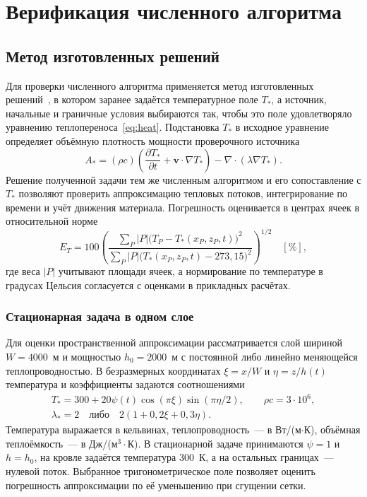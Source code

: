 \section{Верификация численного алгоритма}
\label{sec:verification}

\subsection{Метод изготовленных решений}

Для проверки численного алгоритма применяется метод изготовленных решений~\cite{salari2000}, в котором заранее задаётся температурное поле $T_*$, а источник, начальные и граничные условия выбираются так, чтобы это поле удовлетворяло уравнению теплопереноса~\eqref{eq:heat}. Подстановка $T_*$ в исходное уравнение определяет объёмную плотность мощности проверочного источника
\begin{equation}
 A_* = (\rho c)\left(\frac{\partial T_*}{\partial t}
       + \boldsymbol v \cdot \nabla T_*\right) - \nabla \cdot (\lambda\nabla T_*).
 \label{eq:mms-source}
\end{equation}
Решение полученной задачи тем же численным алгоритмом и его сопоставление с $T_*$ позволяют проверить аппроксимацию тепловых потоков, интегрирование по времени и учёт движения материала. Погрешность оценивается в центрах ячеек в относительной норме
\begin{equation}
 E_T = 100\left(\frac{\sum_P |P|\bigl(T_P - T_*(x_P,z_P,t)\bigr)^2}
 {\sum_P |P|\bigl(T_*(x_P,z_P,t) - 273{,}15\bigr)^2}\right)^{1/2}\quad[\%],
 \label{eq:mms-error}
\end{equation}
где веса $|P|$ учитывают площади ячеек, а нормирование по температуре в градусах Цельсия согласуется с оценками в прикладных расчётах.

\subsubsection{Стационарная задача в одном слое}

Для оценки пространственной аппроксимации рассматривается слой шириной $W=4000$~м и мощностью $h_0=2000$~м с постоянной либо линейно меняющейся теплопроводностью. В безразмерных координатах $\xi=x/W$ и $\eta=z/h(t)$ температура и коэффициенты задаются соотношениями
\begin{gather}
 T_* = 300 + 20\psi(t)\cos(\pi\xi)\sin(\pi\eta/2),\qquad
 \rho c = 3 \cdot 10^6,\label{eq:mms-layer}\\
 \lambda_* = 2\quad\text{либо}\quad 2(1 + 0{,}2\xi + 0{,}3\eta).
\end{gather}
Температура выражается в кельвинах, теплопроводность~--- в Вт/(м$\cdot$К), объёмная теплоёмкость~--- в Дж/(м$^3\cdot$К). В стационарной задаче принимаются $\psi=1$ и $h=h_0$, на кровле задаётся температура 300~К, а на остальных границах~--- нулевой поток. Выбранное тригонометрическое поле позволяет оценить погрешность аппроксимации по её уменьшению при сгущении сетки.

